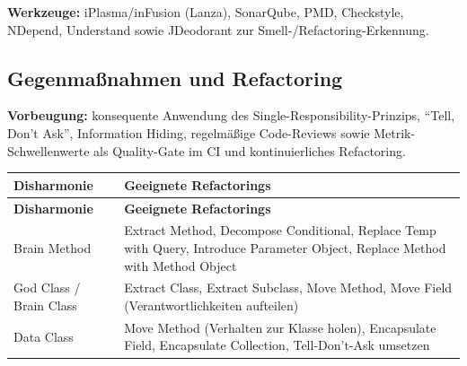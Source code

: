 \documentclass[
	fontsize=12pt,          %
	paper=a4,               %
	numbers=noenddot,       %
	listof=totoc,           %
	listof=entryprefix,     %
	listof=nochaptergap,    %
	bibliography=totoc,     %
	parskip=half,           %
	openany                 %
]{scrbook}
\begin{document}
\textbf{Werkzeuge:} iPlasma/inFusion (Lanza), SonarQube, PMD, Checkstyle,
NDepend, Understand sowie JDeodorant zur Smell-/Refactoring-Erkennung.

\subsection*{Gegenmaßnahmen und Refactoring}

\textbf{Vorbeugung:} konsequente Anwendung des Single-Responsibility-Prinzips,
``Tell, Don't Ask'', Information Hiding, regelmäßige Code-Reviews sowie
Metrik-Schwellenwerte als Quality-Gate im CI und kontinuierliches Refactoring.

\begin{longtable}{| p{3.0cm} | p{8.5cm} |}
	\hline
	\textbf{Disharmonie} & \textbf{Geeignete Refactorings} \\ \hline
	\endfirsthead
	\hline
	\textbf{Disharmonie} & \textbf{Geeignete Refactorings} \\ \hline
	\endhead
	\hline
	\endfoot
	Brain Method & Extract Method, Decompose Conditional, Replace Temp with
	Query, Introduce Parameter Object, Replace Method with Method Object \\ \hline
	God Class / Brain Class & Extract Class, Extract Subclass, Move Method, Move
	Field (Verantwortlichkeiten aufteilen) \\ \hline
	Data Class & Move Method (Verhalten zur Klasse holen), Encapsulate Field,
	Encapsulate Collection, Tell-Don't-Ask umsetzen \\ \hline
\end{longtable}
\end{document}
